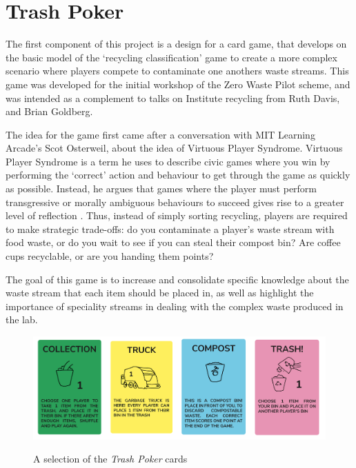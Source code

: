 \documentclass[nofonts,nols,justified,nobib]{tufte-book}
\begin{document}
\newpage

\section*{Trash Poker}

The first component of this project is a design for a card game, that develops on the basic model of the `recycling classification' game to create a more complex scenario where players compete to contaminate one anothers waste streams. This game was developed for the initial workshop of the Zero Waste Pilot scheme, and was intended as a complement to talks on Institute recycling from Ruth Davis, and Brian Goldberg.


The idea for the game first came after a conversation with MIT Learning Arcade's Scot Osterweil, about the idea of Virtuous Player Syndrome. Virtuous Player Syndrome is a term he uses to describe civic games where you win by performing the `correct' action and behaviour to get through the game as quickly as possible. Instead, he argues that games where the player must perform transgressive or morally ambiguous behaviours to succeed gives rise to a greater level of reflection \cite{osterweil_civic_2011}. Thus, instead of simply sorting recycling, players are required to make strategic trade-offs: do you contaminate a player's waste stream with food waste, or do you wait to see if you can steal their compost bin? Are coffee cups recyclable, or are you handing them points?

The goal of this game is to increase and consolidate specific knowledge about the waste stream that each item should be placed in, as well as highlight the importance of speciality streams in dealing with the complex waste produced in the lab.

\begin{figure}
  \caption{A selection of the \emph{Trash Poker} cards}
  \includegraphics[width=1\linewidth]{img/3/trashpoker.png}
  \label{contamination}
\end{figure}
\end{document}
